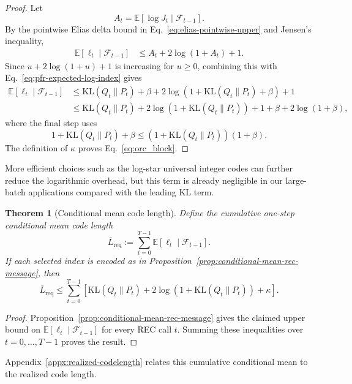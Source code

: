 \documentclass{article}
\theoremstyle{plain}
\newtheorem{theorem}{Theorem}[section]
\theoremstyle{definition}
\theoremstyle{remark}
\begin{document}
\begin{proof}
Let
\begin{equation}
    A_t
    =
    \mathbb E[\log J_t\mid\mathcal F_{t-1}].
\end{equation}
By the pointwise Elias delta bound in Eq.~\eqref{eq:elias-pointwise-upper} and Jensen's inequality,
\begin{align}
    \mathbb E[\ell_t\mid\mathcal F_{t-1}]
    &\leq
    A_t+
    2\log(1+A_t)
    +1.
\end{align}
Since $u+2\log(1+u)+1$ is increasing for $u\geq0$, combining this with Eq.~\eqref{eq:pfr-expected-log-index} gives
\begin{align}
    \mathbb E[\ell_t\mid\mathcal F_{t-1}]
    &\leq
    \mathrm{KL}(Q_t\|P_t)
    +\beta
    +2\log\!\left(1+\mathrm{KL}(Q_t\|P_t)+\beta\right)
    +1
    \\
    &\leq
    \mathrm{KL}(Q_t\|P_t)
    +2\log\!\left(1+\mathrm{KL}(Q_t\|P_t)\right)
    +1+\beta+2\log(1+\beta),
\end{align}
where the final step uses
\begin{equation}
    1+\mathrm{KL}(Q_t\|P_t)+\beta
    \leq
    \left(1+\mathrm{KL}(Q_t\|P_t)\right)(1+\beta).
\end{equation}
The definition of $\kappa$ proves Eq.~\eqref{eq:orc_block}.
\end{proof}

More efficient choices such as the log-star universal integer codes \citep{rissanen1983universal} can further reduce the logarithmic overhead, but this term is already negligible in our large-batch applications compared with the leading KL term.

\begin{theorem}[Conditional mean code length]
\label{thm:conditional-mean-codelength}
Define the cumulative one-step conditional mean code length
\begin{equation}
\overline{L}_{\mathrm{req}}
:=
\sum_{t=0}^{T-1}\mathbb{E}[\ell_t\mid\mathcal F_{t-1}].
\end{equation}
If each selected index is encoded as in Proposition~\ref{prop:conditional-mean-rec-message}, then
\begin{equation}
\overline{L}_{\mathrm{req}}
\le
\sum_{t=0}^{T-1}
\left[
\mathrm{KL}(Q_t\|P_t)
+2\log\!\left(1+\mathrm{KL}(Q_t\|P_t)\right)
+\kappa
\right].
\end{equation}
\end{theorem}

\begin{proof}
Proposition~\ref{prop:conditional-mean-rec-message} gives the claimed upper bound on $\mathbb{E}[\ell_t\mid\mathcal F_{t-1}]$ for every REC call $t$. Summing these inequalities over $t=0,\ldots,T-1$ proves the result.
\end{proof}
Appendix~\ref{appx:realized-codelength} relates this cumulative conditional mean to the realized code length.
\end{document}
